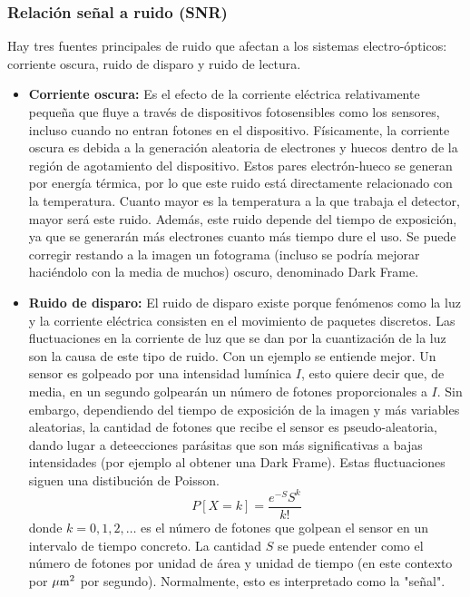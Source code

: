 \documentclass[12pt]{article}
\numberwithin{equation}{section}%
\newcommand{\lightit}[1]{{\lightitfont #1}}
\begin{document}
\subsubsection{Relación señal a ruido (SNR)}
\label{sec:ruido}
Hay tres fuentes principales de ruido que afectan a los sistemas electro-ópticos: corriente oscura, ruido de disparo y ruido de lectura.

\begin{itemize}
    \item \textbf{Corriente oscura:} Es el efecto de la corriente eléctrica relativamente pequeña que fluye a través de dispositivos fotosensibles como los sensores, incluso cuando no entran fotones en el dispositivo. Físicamente, la corriente oscura es debida a la generación aleatoria de electrones y huecos dentro de la región de agotamiento del dispositivo. Estos pares electrón-hueco se generan por energía térmica, por lo que este ruido está directamente relacionado con la temperatura. Cuanto mayor es la temperatura a la que trabaja el detector, mayor será este ruido. Además, este ruido depende del tiempo de exposición, ya que se generarán más electrones cuanto más tiempo dure el uso. Se puede corregir restando a la imagen un fotograma (incluso se podría mejorar haciéndolo con la media de muchos) oscuro, denominado \lightit{Dark Frame}.
    
    \item \textbf{Ruido de disparo:} El ruido de disparo existe porque fenómenos como la luz y la corriente eléctrica consisten en el movimiento de paquetes discretos. Las fluctuaciones en la corriente de luz que se dan por la cuantización de la luz son la causa de este tipo de ruido. Con un ejemplo se entiende mejor. Un sensor es golpeado por una intensidad lumínica \(I\), esto quiere decir que, de media, en un segundo golpearán un número de fotones proporcionales a \(I\). Sin embargo, dependiendo del tiempo de exposición de la imagen y más variables aleatorias, la cantidad de fotones que recibe el sensor es \lightit{pseudo-aleatoria}, dando lugar a deteecciones parásitas que son más significativas a bajas intensidades (por ejemplo al obtener una \lightit{Dark Frame}). Estas fluctuaciones siguen una distibución de Poisson. 
    \begin{equation}
        P[X=k] = \frac{e^{-S}S^k}{k!}
    \end{equation}
    donde \(k=0, 1, 2, \dots\) es el número de fotones que golpean el sensor en un intervalo de tiempo concreto. La cantidad \(S\) se puede entender como el número de fotones por unidad de área y unidad de tiempo (en este contexto por \(\mu\text{\small m}^2\) por segundo). Normalmente, esto es interpretado como la "señal".


\end{itemize}
\end{document}
